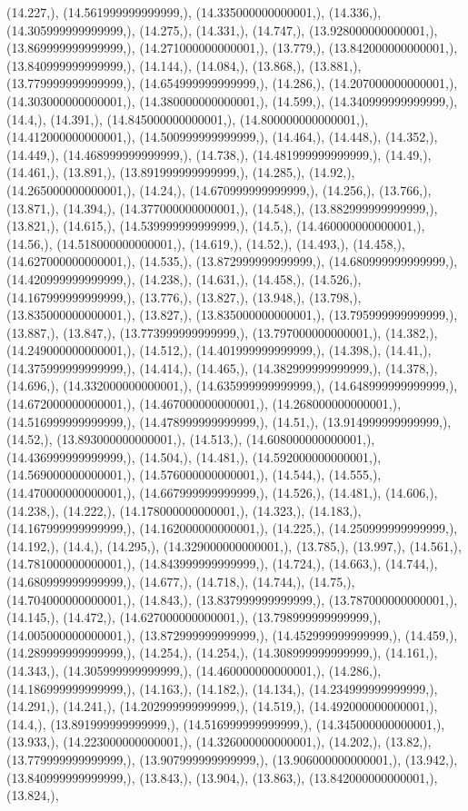 \documentclass{article}
\begin{document}
(14.227,), (14.561999999999999,), (14.335000000000001,), (14.336,), (14.305999999999999,), (14.275,), (14.331,), (14.747,), (13.928000000000001,), (13.869999999999999,), (14.271000000000001,), (13.779,), (13.842000000000001,), (13.840999999999999,), (14.144,), (14.084,), (13.868,), (13.881,), (13.779999999999999,), (14.654999999999999,), (14.286,), (14.207000000000001,), (14.303000000000001,), (14.380000000000001,), (14.599,), (14.340999999999999,), (14.4,), (14.391,), (14.845000000000001,), (14.800000000000001,), (14.412000000000001,), (14.500999999999999,), (14.464,), (14.448,), (14.352,), (14.449,), (14.468999999999999,), (14.738,), (14.481999999999999,), (14.49,), (14.461,), (13.891,), (13.891999999999999,), (14.285,), (14.92,), (14.265000000000001,), (14.24,), (14.670999999999999,), (14.256,), (13.766,), (13.871,), (14.394,), (14.377000000000001,), (14.548,), (13.882999999999999,), (13.821,), (14.615,), (14.539999999999999,), (14.5,), (14.460000000000001,), (14.56,), (14.518000000000001,), (14.619,), (14.52,), (14.493,), (14.458,), (14.627000000000001,), (14.535,), (13.872999999999999,), (14.680999999999999,), (14.420999999999999,), (14.238,), (14.631,), (14.458,), (14.526,), (14.167999999999999,), (13.776,), (13.827,), (13.948,), (13.798,), (13.835000000000001,), (13.827,), (13.835000000000001,), (13.795999999999999,), (13.887,), (13.847,), (13.773999999999999,), (13.797000000000001,), (14.382,), (14.249000000000001,), (14.512,), (14.401999999999999,), (14.398,), (14.41,), (14.375999999999999,), (14.414,), (14.465,), (14.382999999999999,), (14.378,), (14.696,), (14.332000000000001,), (14.635999999999999,), (14.648999999999999,), (14.672000000000001,), (14.467000000000001,), (14.268000000000001,), (14.516999999999999,), (14.478999999999999,), (14.51,), (13.914999999999999,), (14.52,), (13.893000000000001,), (14.513,), (14.608000000000001,), (14.436999999999999,), (14.504,), (14.481,), (14.592000000000001,), (14.569000000000001,), (14.576000000000001,), (14.544,), (14.555,), (14.470000000000001,), (14.667999999999999,), (14.526,), (14.481,), (14.606,), (14.238,), (14.222,), (14.178000000000001,), (14.323,), (14.183,), (14.167999999999999,), (14.162000000000001,), (14.225,), (14.250999999999999,), (14.192,), (14.4,), (14.295,), (14.329000000000001,), (13.785,), (13.997,), (14.561,), (14.781000000000001,), (14.843999999999999,), (14.724,), (14.663,), (14.744,), (14.680999999999999,), (14.677,), (14.718,), (14.744,), (14.75,), (14.704000000000001,), (14.843,), (13.837999999999999,), (13.787000000000001,), (14.145,), (14.472,), (14.627000000000001,), (13.798999999999999,), (14.005000000000001,), (13.872999999999999,), (14.452999999999999,), (14.459,), (14.289999999999999,), (14.254,), (14.254,), (14.308999999999999,), (14.161,), (14.343,), (14.305999999999999,), (14.460000000000001,), (14.286,), (14.186999999999999,), (14.163,), (14.182,), (14.134,), (14.234999999999999,), (14.291,), (14.241,), (14.202999999999999,), (14.519,), (14.492000000000001,), (14.4,), (13.891999999999999,), (14.516999999999999,), (14.345000000000001,), (13.933,), (14.223000000000001,), (14.326000000000001,), (14.202,), (13.82,), (13.779999999999999,), (13.907999999999999,), (13.906000000000001,), (13.942,), (13.840999999999999,), (13.843,), (13.904,), (13.863,), (13.842000000000001,), (13.824,), 
\end{document}
